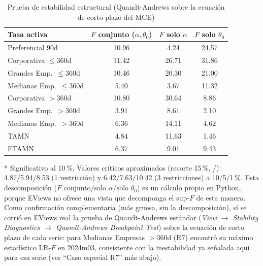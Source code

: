 \documentclass[12pt, letterpaper]{article}
\begin{document}
\begin{table}[ht]
\renewcommand{\thetable}{7}
\begin{threeparttable}
\caption{Prueba de estabilidad estructural (Quandt-Andrews sobre la
         ecuación de corto plazo del MCE)}
\label{tab:estabilidad}
\small
\begin{tabular}{lccc}
\toprule
Tasa activa & $F$ conjunto ($\alpha,\theta_0$) & $F$ solo $\alpha$ & $F$ solo $\theta_0$ \\
\midrule
Preferencial 90d         & 10.96\rlap{*} & 4.24          & 24.57\rlap{*} \\
Corporativa $\le$360d    & 11.42\rlap{*} & 26.71\rlap{*} & 31.86\rlap{*} \\
Grandes Emp.\ $\le$360d  & 10.46\rlap{*} & 20.30\rlap{*} & 21.00\rlap{*} \\
Medianas Emp.\ $\le$360d &  5.40         &  3.67         & 11.32\rlap{*} \\
Corporativa $>$360d      & 10.80\rlap{*} & 30.64\rlap{*} &  8.86\rlap{*} \\
Grandes Emp.\ $>$360d    &  3.91         &  8.61\rlap{*} &  2.10         \\
Medianas Emp.\ $>$360d   &  6.36         & 14.11\rlap{*} &  4.62         \\
TAMN                     &  4.84         & 11.63\rlap{*} &  1.46         \\
FTAMN                    &  6.37         &  9.01\rlap{*} &  9.43\rlap{*} \\
\bottomrule
\end{tabular}
\begin{tablenotes}[flushleft]
\footnotesize\item
* Significativo al 10\,\%. Valores críticos aproximados (recorte
15\,\%, \textcite{andrews1993}/\textcite{andrewsploberger1994}):
4.87/5.94/8.53 (1 restricción) y 6.42/7.63/10.42 (3 restricciones) a
10/5/1\,\%. Esta descomposición ($F$ conjunto/solo $\alpha$/solo
$\theta_0$) es un cálculo propio en Python, porque EViews no ofrece
una vista que decomponga el sup-$F$ de esta manera. Como confirmación
complementaria (más gruesa, sin la descomposición), sí se corrió en
EViews real la prueba de Quandt-Andrews estándar (\emph{View
$\to$ Stability Diagnostics $\to$ Quandt-Andrews Breakpoint Test})
sobre la ecuación de corto plazo de cada serie: para Medianas Empresas
$>$360d (R7) encontró su máximo estadístico LR-$F$ en 2024m03,
consistente con la inestabilidad ya señalada aquí para esa serie (ver
``Caso especial R7'' más abajo).
\end{tablenotes}
\end{threeparttable}
\end{table}
\end{document}
